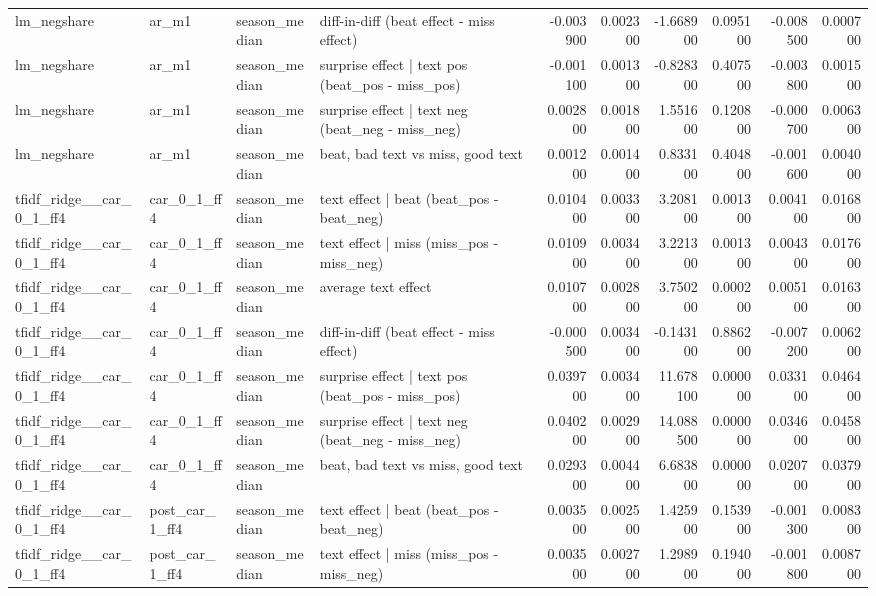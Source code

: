 \begin{table}
\begin{tabular}{llllrrrrrr}
lm\_negshare & ar\_m1 & season\_median & diff-in-diff (beat effect - miss effect) & -0.003900 & 0.002300 & -1.668900 & 0.095100 & -0.008500 & 0.000700 \\
lm\_negshare & ar\_m1 & season\_median & surprise effect | text pos (beat\_pos - miss\_pos) & -0.001100 & 0.001300 & -0.828300 & 0.407500 & -0.003800 & 0.001500 \\
lm\_negshare & ar\_m1 & season\_median & surprise effect | text neg (beat\_neg - miss\_neg) & 0.002800 & 0.001800 & 1.551600 & 0.120800 & -0.000700 & 0.006300 \\
lm\_negshare & ar\_m1 & season\_median & beat, bad text vs miss, good text & 0.001200 & 0.001400 & 0.833100 & 0.404800 & -0.001600 & 0.004000 \\
tfidf\_ridge\_\_car\_0\_1\_ff4 & car\_0\_1\_ff4 & season\_median & text effect | beat  (beat\_pos - beat\_neg) & 0.010400 & 0.003300 & 3.208100 & 0.001300 & 0.004100 & 0.016800 \\
tfidf\_ridge\_\_car\_0\_1\_ff4 & car\_0\_1\_ff4 & season\_median & text effect | miss  (miss\_pos - miss\_neg) & 0.010900 & 0.003400 & 3.221300 & 0.001300 & 0.004300 & 0.017600 \\
tfidf\_ridge\_\_car\_0\_1\_ff4 & car\_0\_1\_ff4 & season\_median & average text effect & 0.010700 & 0.002800 & 3.750200 & 0.000200 & 0.005100 & 0.016300 \\
tfidf\_ridge\_\_car\_0\_1\_ff4 & car\_0\_1\_ff4 & season\_median & diff-in-diff (beat effect - miss effect) & -0.000500 & 0.003400 & -0.143100 & 0.886200 & -0.007200 & 0.006200 \\
tfidf\_ridge\_\_car\_0\_1\_ff4 & car\_0\_1\_ff4 & season\_median & surprise effect | text pos (beat\_pos - miss\_pos) & 0.039700 & 0.003400 & 11.678100 & 0.000000 & 0.033100 & 0.046400 \\
tfidf\_ridge\_\_car\_0\_1\_ff4 & car\_0\_1\_ff4 & season\_median & surprise effect | text neg (beat\_neg - miss\_neg) & 0.040200 & 0.002900 & 14.088500 & 0.000000 & 0.034600 & 0.045800 \\
tfidf\_ridge\_\_car\_0\_1\_ff4 & car\_0\_1\_ff4 & season\_median & beat, bad text vs miss, good text & 0.029300 & 0.004400 & 6.683800 & 0.000000 & 0.020700 & 0.037900 \\
tfidf\_ridge\_\_car\_0\_1\_ff4 & post\_car\_1\_ff4 & season\_median & text effect | beat  (beat\_pos - beat\_neg) & 0.003500 & 0.002500 & 1.425900 & 0.153900 & -0.001300 & 0.008300 \\
tfidf\_ridge\_\_car\_0\_1\_ff4 & post\_car\_1\_ff4 & season\_median & text effect | miss  (miss\_pos - miss\_neg) & 0.003500 & 0.002700 & 1.298900 & 0.194000 & -0.001800 & 0.008700 \\

\end{tabular}
\end{table}

